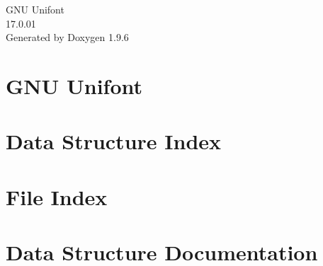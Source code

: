 \documentclass[twoside]{book}
\newcommand{\+}{\discretionary{\mbox{\scriptsize$\hookleftarrow$}}{}{}}
\newcommand{\clearemptydoublepage}{%
    \newpage{\pagestyle{empty}\cleardoublepage}%
  }
\begin{document}
  \raggedbottom
    \hypersetup{pageanchor=false,
                bookmarksnumbered=true,
                pdfencoding=unicode
               }
  \begin{titlepage}
  \vspace*{7cm}
  \begin{center}%
  {\Large GNU Unifont}\\
  [1ex]\large 17.\+0.\+01 \\
  \vspace*{1cm}
  {\large Generated by Doxygen 1.9.6}\\
  \end{center}
  \end{titlepage}
  \clearemptydoublepage
  \tableofcontents
  \clearemptydoublepage
  \hypersetup{pageanchor=true}
\renewcommand{\+}{}
\nonstopmode
\chapter{GNU Unifont}
\label{index}\hypertarget{index}{}
\chapter{Data Structure Index}

\chapter{File Index}

\chapter{Data Structure Documentation}








\end{document}
